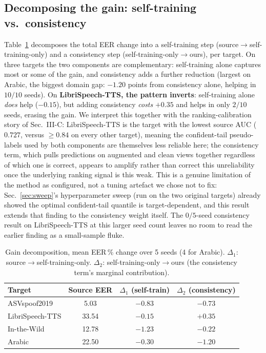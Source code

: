 \documentclass[conference]{IEEEtran}
\begin{document}
\subsection{Decomposing the gain: self-training vs.\ consistency}
\label{sec:gaindecomp}
Table~\ref{tab:gaindecomp} decomposes the total EER change into a
self-training step (source$\to$self-training-only) and a consistency step
(self-training-only$\to$ours), per target. On three targets the two components
are complementary: self-training alone captures most or some of the gain, and
consistency adds a further reduction (largest on Arabic, the biggest domain
gap: $-1.20$ points from consistency alone, helping in $10/10$ seeds). On
\textbf{LibriSpeech-TTS, the pattern inverts}: self-training alone \emph{does}
help ($-0.15$), but adding consistency \emph{costs} $+0.35$ and helps in only
$2/10$ seeds, erasing the gain. We interpret this together
with the ranking-calibration story of Sec.~III-C: LibriSpeech-TTS is the target
with the lowest source AUC ($0.727$, versus $\geq\!0.84$ on every other
target), meaning the confident-tail pseudo-labels used by both components are
themselves less reliable here; the consistency term, which pulls predictions on
augmented and clean views together regardless of which one is correct, appears
to amplify rather than correct this unreliability once the underlying ranking
signal is this weak. This is a genuine limitation of the method as configured,
not a tuning artefact we chose not to fix: Sec.~\ref{sec:sweep}'s
hyperparameter sweep (run on the two original targets) already showed the
optimal confident-tail quantile is target-dependent, and this result extends
that finding to the consistency weight itself. The $0/5$-seed consistency
result on LibriSpeech-TTS at this larger seed count leaves no room to read the
earlier finding as a small-sample fluke.

\begin{table}[t]
\centering
\caption{Gain decomposition, mean EER\,\% change over 5 seeds (4 for Arabic).
$\Delta_1$: source$\to$self-training-only. $\Delta_2$: self-training-only$\to$ours
(the consistency term's marginal contribution).}
\label{tab:gaindecomp}
\begin{tabular}{@{}lccc@{}}
\toprule
Target & Source EER & $\Delta_1$ (self-train) & $\Delta_2$ (consistency) \\
\midrule
ASVspoof2019 & 5.03 & $-0.83$ & $-0.73$ \\
LibriSpeech-TTS & 33.54 & $-0.15$ & \cellcolor{red!10}$+0.35$ \\
In-the-Wild & 12.78 & $-1.23$ & $-0.22$ \\
Arabic & 22.50 & $-0.30$ & $-1.20$ \\
\bottomrule
\end{tabular}
\end{table}
\end{document}
